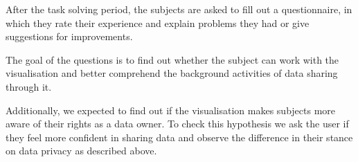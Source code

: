 \documentclass[../paper.tex]{subfiles}
\begin{document}
  After the task solving period, the subjects are asked to fill out a
  questionnaire, in which they rate their experience and explain problems
  they had or give suggestions for improvements.

  The goal of the questions is to find out whether the subject can work with the visualisation
  and better comprehend the background activities of data sharing through it.

  Additionally, we expected to find out if the visualisation makes subjects more
  aware of their rights as a data owner. To check this hypothesis we ask the
  user if they feel more confident in sharing data and observe the difference in
  their stance on data privacy as described above.
\end{document}
